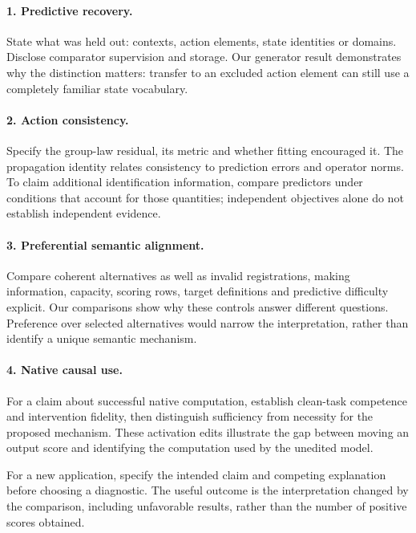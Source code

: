 \paragraph{1. Predictive recovery.}
State what was held out: contexts, action elements, state identities or domains. Disclose comparator supervision and storage. Our generator result demonstrates why the distinction matters: transfer to an excluded action element can still use a completely familiar state vocabulary.

\paragraph{2. Action consistency.}
Specify the group-law residual, its metric and whether fitting encouraged it. The propagation identity relates consistency to prediction errors and operator norms. To claim additional identification information, compare predictors under conditions that account for those quantities; independent objectives alone do not establish independent evidence.

\paragraph{3. Preferential semantic alignment.}
Compare coherent alternatives as well as invalid registrations, making information, capacity, scoring rows, target definitions and predictive difficulty explicit. Our comparisons show why these controls answer different questions. Preference over selected alternatives would narrow the interpretation, rather than identify a unique semantic mechanism.

\paragraph{4. Native causal use.}
For a claim about successful native computation, establish clean-task competence and intervention fidelity, then distinguish sufficiency from necessity for the proposed mechanism. These activation edits illustrate the gap between moving an output score and identifying the computation used by the unedited model.

For a new application, specify the intended claim and competing explanation before choosing a diagnostic. The useful outcome is the interpretation changed by the comparison, including unfavorable results, rather than the number of positive scores obtained.

